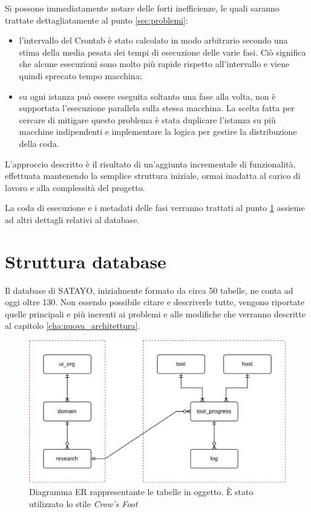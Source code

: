 Si possono immediatamente notare delle forti inefficienze, le quali saranno trattate
dettagliatamente al punto \ref{sec:problemi}:

\begin{itemize}
  \item l'intervallo del Crontab è stato calcolato in modo arbitrario secondo una
    stima della media pesata dei tempi di esecuzione delle varie fasi. Ciò
    significa che alcune esecuzioni sono molto più rapide rispetto all'intervallo
    e viene quindi sprecato tempo macchina;

  \item su ogni istanza può essere eseguita soltanto una fase alla volta, non è
    supportata l'esecuzione parallela sulla stessa macchina. La scelta fatta per
    cercare di mitigare questo problema è stata duplicare l'istanza su più macchine
    indipendenti e implementare la logica per gestire la distribuzione della coda.
\end{itemize}

L'approccio descritto è il risultato di un'aggiunta incrementale di funzionalità,
effettuata mantenendo la semplice struttura iniziale, ormai inadatta al carico
di lavoro e alla complessità del progetto.

La coda di esecuzione e i metadati delle fasi verranno trattati al punto
\ref{sec:database} assieme ad altri dettagli relativi al database.

\section{Struttura database}
\label{sec:database}

Il database di SATAYO, inizialmente formato da circa 50 tabelle, ne conta ad oggi
oltre 130. Non essendo possibile citare e descriverle tutte, vengono riportate
quelle principali e più inerenti ai problemi e alle modifiche che verranno
descritte al capitolo \ref{cha:nuova_architettura}.

\begin{figure}[htbp]
  \centering
  \includegraphics[width=.8\linewidth]{images/SATAYO_db-core-er.png}
  \caption{Diagramma ER rappresentante le tabelle in oggetto. È stato utilizzato
  lo stile \textit{Crow's Foot}}
  \label{fig:er_diagram}
\end{figure}

